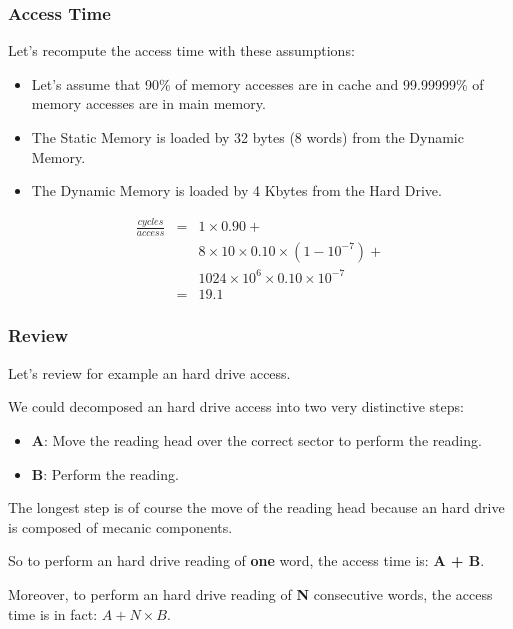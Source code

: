 
\begin{frame}
  \frametitle{Access Time}

  Let's recompute the access time with these assumptions:

  \begin{itemize}
    \item
      Let's assume that 90\% of memory accesses are in cache and
      99.99999\% of memory accesses are in main memory.
    \item
      The Static Memory is loaded by 32 bytes (8 words) from the
      Dynamic Memory.
    \item
      The Dynamic Memory is loaded by 4 Kbytes from the Hard Drive.
  \end{itemize}

  \-

  \begin{eqnarray*}
    \frac{cycles}{access} & = & 1 \times 0.90 + \\
                          &   & 8 \times 10 \times 0.10 \times
                                (1 - 10^{-7}) + \\
                          &   & 1024 \times 10^{6} \times 0.10 \times
                                10^{-7} \\
                          & = & 19.1
  \end{eqnarray*}
\end{frame}


\begin{frame}
  \frametitle{Review}

  Let's review for example an hard drive access.

  \-

  We could decomposed an hard drive access into two very distinctive steps:

  \begin{itemize}
    \item
      \textbf{A}: Move the reading head over the correct sector to
      perform the reading.
    \item
      \textbf{B}: Perform the reading.
  \end{itemize}

  The longest step is of course the move of the reading head because an hard
  drive is composed of mecanic components.

  \-

  So to perform an hard drive reading of \textbf{one} word, the access time
  is: \textbf{A + B}.

  \-

  Moreover, to perform an hard drive reading of \textbf{N} consecutive
  words, the access time is in fact: \textbf{$A + N \times B$}.
\end{frame}

